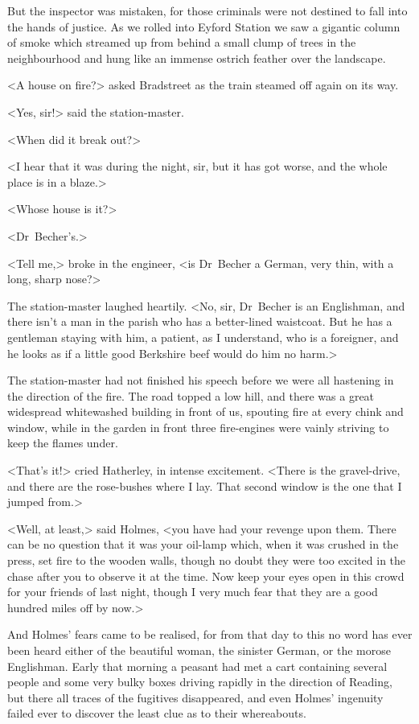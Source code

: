 But the inspector was mistaken, for those criminals were not destined to fall into the hands of justice. As we rolled into Eyford Station we saw a gigantic column of smoke which streamed up from behind a small clump of trees in the neighbourhood and hung like an immense ostrich feather over the landscape.

<A house on fire?> asked Bradstreet as the train steamed off again on its way.

<Yes, sir!> said the station-master.

<When did it break out?>

<I hear that it was during the night, sir, but it has got worse, and the whole place is in a blaze.>

<Whose house is it?>

<Dr~Becher's.>

<Tell me,> broke in the engineer, <is Dr~Becher a German, very thin, with a long, sharp nose?>

The station-master laughed heartily. <No, sir, Dr~Becher is an Englishman, and there isn't a man in the parish who has a better-lined waistcoat. But he has a gentleman staying with him, a patient, as I understand, who is a foreigner, and he looks as if a little good Berkshire beef would do him no harm.>

The station-master had not finished his speech before we were all hastening in the direction of the fire. The road topped a low hill, and there was a great widespread whitewashed building in front of us, spouting fire at every chink and window, while in the garden in front three fire-engines were vainly striving to keep the flames under.

<That's it!> cried Hatherley, in intense excitement. <There is the gravel-drive, and there are the rose-bushes where I lay. That second window is the one that I jumped from.>

<Well, at least,> said Holmes, <you have had your revenge upon them. There can be no question that it was your oil-lamp which, when it was crushed in the press, set fire to the wooden walls, though no doubt they were too excited in the chase after you to observe it at the time. Now keep your eyes open in this crowd for your friends of last night, though I very much fear that they are a good hundred miles off by now.>

And Holmes' fears came to be realised, for from that day to this no word has ever been heard either of the beautiful woman, the sinister German, or the morose Englishman. Early that morning a peasant had met a cart containing several people and some very bulky boxes driving rapidly in the direction of Reading, but there all traces of the fugitives disappeared, and even Holmes' ingenuity failed ever to discover the least clue as to their whereabouts.

